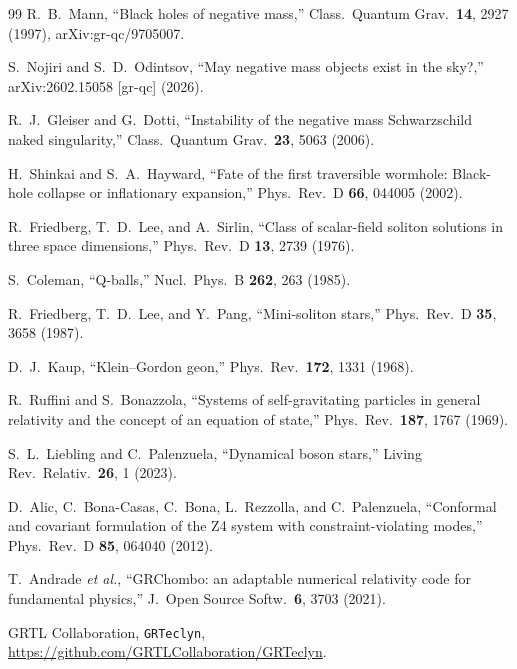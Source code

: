 \documentclass[twocolumn,floatfix,aps,prd,nofootinbib]{revtex4-2}
\begin{document}
\begin{thebibliography}{99}
R.~B.~Mann,
\newblock ``Black holes of negative mass,''
\newblock Class.\ Quantum Grav.\ \textbf{14}, 2927 (1997), arXiv:gr-qc/9705007.

S.~Nojiri and S.~D.~Odintsov,
\newblock ``May negative mass objects exist in the sky?,''
\newblock arXiv:2602.15058 [gr-qc] (2026).

R.~J.~Gleiser and G.~Dotti,
\newblock ``Instability of the negative mass Schwarzschild naked singularity,''
\newblock Class.\ Quantum Grav.\ \textbf{23}, 5063 (2006).

H.~Shinkai and S.~A.~Hayward,
\newblock ``Fate of the first traversible wormhole: Black-hole collapse or inflationary expansion,''
\newblock Phys.\ Rev.\ D \textbf{66}, 044005 (2002).

R.~Friedberg, T.~D.~Lee, and A.~Sirlin,
\newblock ``Class of scalar-field soliton solutions in three space dimensions,''
\newblock Phys.\ Rev.\ D \textbf{13}, 2739 (1976).

S.~Coleman,
\newblock ``Q-balls,''
\newblock Nucl.\ Phys.\ B \textbf{262}, 263 (1985).

R.~Friedberg, T.~D.~Lee, and Y.~Pang,
\newblock ``Mini-soliton stars,''
\newblock Phys.\ Rev.\ D \textbf{35}, 3658 (1987).

D.~J.~Kaup,
\newblock ``Klein--Gordon geon,''
\newblock Phys.\ Rev.\ \textbf{172}, 1331 (1968).

R.~Ruffini and S.~Bonazzola,
\newblock ``Systems of self-gravitating particles in general relativity and the concept of an equation of state,''
\newblock Phys.\ Rev.\ \textbf{187}, 1767 (1969).

S.~L.~Liebling and C.~Palenzuela,
\newblock ``Dynamical boson stars,''
\newblock Living Rev.\ Relativ.\ \textbf{26}, 1 (2023).

D.~Alic, C.~Bona-Casas, C.~Bona, L.~Rezzolla, and C.~Palenzuela,
\newblock ``Conformal and covariant formulation of the Z4 system with constraint-violating modes,''
\newblock Phys.\ Rev.\ D \textbf{85}, 064040 (2012).

T.~Andrade \emph{et al.},
\newblock ``GRChombo: an adaptable numerical relativity code for fundamental physics,''
\newblock J.\ Open Source Softw.\ \textbf{6}, 3703 (2021).

GRTL Collaboration,
\newblock \texttt{GRTeclyn},
\newblock \url{https://github.com/GRTLCollaboration/GRTeclyn}.


\end{thebibliography}
\end{document}
